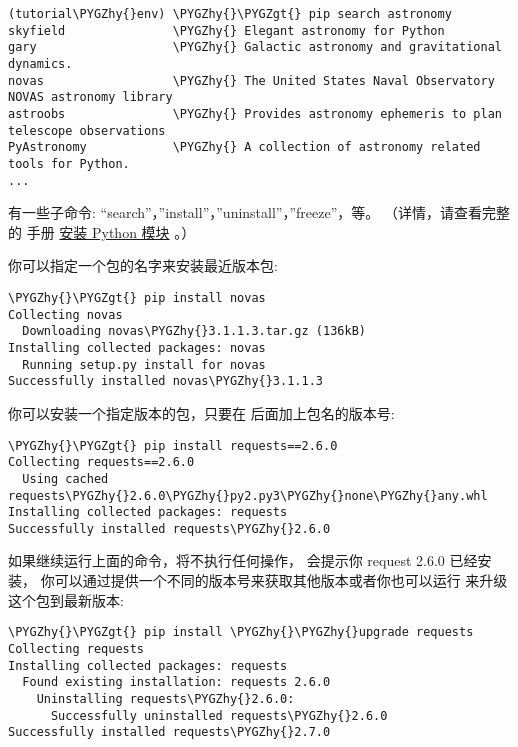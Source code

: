 \documentclass[a4paper,10pt,english]{sphinxmanual}
\def\PYGZgt{\char`\>}
\def\PYGZhy{\char`\-}
\begin{document}
\begin{Verbatim}[commandchars=\\\{\}]
(tutorial\PYGZhy{}env) \PYGZhy{}\PYGZgt{} pip search astronomy
skyfield               \PYGZhy{} Elegant astronomy for Python
gary                   \PYGZhy{} Galactic astronomy and gravitational dynamics.
novas                  \PYGZhy{} The United States Naval Observatory NOVAS astronomy library
astroobs               \PYGZhy{} Provides astronomy ephemeris to plan telescope observations
PyAstronomy            \PYGZhy{} A collection of astronomy related tools for Python.
...
\end{Verbatim}

 有一些子命令: ``search''，''install''，''uninstall''，''freeze''，等。
（详情，请查看完整的  手册 \href{https://docs.python.org/3/installing/index.html\#installing-index}{安装 Python 模块} 。）

你可以指定一个包的名字来安装最近版本包:

\begin{Verbatim}[commandchars=\\\{\}]
\PYGZhy{}\PYGZgt{} pip install novas
Collecting novas
  Downloading novas\PYGZhy{}3.1.1.3.tar.gz (136kB)
Installing collected packages: novas
  Running setup.py install for novas
Successfully installed novas\PYGZhy{}3.1.1.3
\end{Verbatim}

你可以安装一个指定版本的包，只要在 \code{==} 后面加上包名的版本号:

\begin{Verbatim}[commandchars=\\\{\}]
\PYGZhy{}\PYGZgt{} pip install requests==2.6.0
Collecting requests==2.6.0
  Using cached requests\PYGZhy{}2.6.0\PYGZhy{}py2.py3\PYGZhy{}none\PYGZhy{}any.whl
Installing collected packages: requests
Successfully installed requests\PYGZhy{}2.6.0
\end{Verbatim}

如果继续运行上面的命令，将不执行任何操作，  会提示你 request 2.6.0 已经安装，
你可以通过提供一个不同的版本号来获取其他版本或者你也可以运行  来升级这个包到最新版本:

\begin{Verbatim}[commandchars=\\\{\}]
\PYGZhy{}\PYGZgt{} pip install \PYGZhy{}\PYGZhy{}upgrade requests
Collecting requests
Installing collected packages: requests
  Found existing installation: requests 2.6.0
    Uninstalling requests\PYGZhy{}2.6.0:
      Successfully uninstalled requests\PYGZhy{}2.6.0
Successfully installed requests\PYGZhy{}2.7.0
\end{Verbatim}
\end{document}
